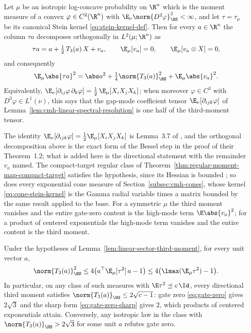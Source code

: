 \documentclass[../../main.tex]{subfiles}
\begin{document}
\begin{lemma}
\label{lem:linear-sector-third-moment}
Let $\mu$ be an isotropic log-concave probability on $\R^n$ which is the moment measure of a
convex $\varphi\in C^2(\R^n)$ with $\E_\nu\norm{D^2\varphi}_{\HS}^2<\infty$, and let
$\tau=\tau_\mu$ be its canonical Stein kernel \eqref{eq:stein-kernel-def}. Then for every
$a\in\R^n$ the column $\tau a$ decomposes orthogonally in $L^2(\mu;\R^n)$ as
\[
  \tau a=a+\tfrac12\,T_3(a)\,X+v_a,
  \qquad
  \E_\mu[v_a]=0,\qquad \E_\mu[v_a\otimes X]=0,
\]
and consequently
\begin{equation}
  \E_\mu\abs{\tau a}^2=\abs a^2+\tfrac14\norm{T_3(a)}_{\HS}^2+\E_\mu\abs{v_a}^2 .
  \label{eq:linear-sector-third-moment}
\end{equation}
Equivalently, $\E_\nu[\partial_{ij}\varphi\,\partial_k\varphi]=\tfrac12\,\E_\mu[X_iX_jX_k]$; when moreover
$\varphi\in C^3$ with $D^3\varphi\in L^1(\nu)$, this says that the gap-mode coefficient tensor
$\E_\nu[\partial_{ijk}\varphi]$ of Lemma~\ref{lem:cmh-linear-spectral-resolution} is one half of
the third-moment tensor.
\end{lemma}

The identity $\E_\nu[\partial_{ijk}\varphi]=\tfrac12\E_\mu[X_iX_jX_k]$ is Lemma~3.7 of
\cite{ChenKlartag2026SharpThinShell}, and the orthogonal decomposition above is the exact form
of the Bessel step in the proof of their Theorem~1.2; what is added here is the directional
statement with the remainder $v_a$ named. The compact-target regular class of
Theorem~\ref{thm:regular-moment-map-compact-target} satisfies the hypothesis, since its Hessian is bounded \cite{Klartag2013MomentMeasures}; so
does every exponential cone measure of Section~\ref{subsec:cmh-cones}, whose kernel
\eqref{eq:cone-stein-kernel} is the Gamma radial variable times a matrix bounded by the same
result applied to the base. For a symmetric
$\mu$ the third moment vanishes and the entire gate-zero content is the high-mode term
$\E\abs{v_a}^2$; for a product of centered exponentials the high-mode term vanishes and
the entire content is the third moment.

\begin{corollary}
\label{cor:gate-zero-third-moment}
Under the hypotheses of Lemma~\ref{lem:linear-sector-third-moment}, for every unit vector $a$,
\[
  \norm{T_3(a)}_{\HS}^2
  \le4\bigl(a^\top\E_\mu[\tau^2]\,a-1\bigr)
  \le4\bigl(\lmax(\E_\mu\tau^2)-1\bigr).
\]
In particular, on any class of such measures with $\E\tau^2\preceq c\,\Id$, every directional
third moment satisfies $\norm{T_3(a)}_{\HS}\le2\sqrt{c-1}$: gate zero \eqref{eq:gate-zero}
gives $2\sqrt3$ and the sharp form \eqref{eq:gate-zero-sharp} gives $2$, which products of
centered exponentials attain. Conversely, any isotropic law in the class with
$\norm{T_3(a)}_{\HS}>2\sqrt3$ for some unit $a$ refutes gate zero.
\end{corollary}
\end{document}
